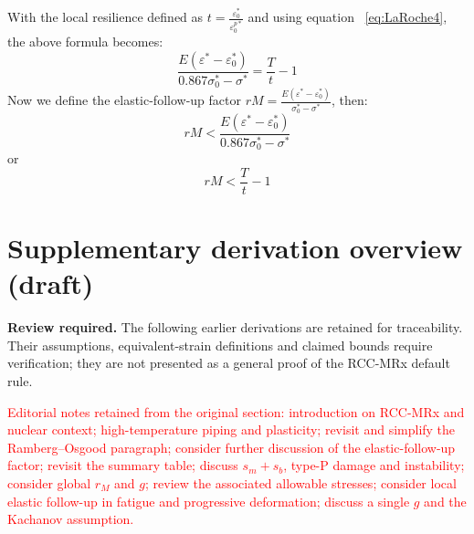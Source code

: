 \documentclass[10pt,a4paper]{article}
\let\oldsection\section
\newif\ifsectionstarted
\renewcommand{\section}{%
  \ifsectionstarted\clearpage\else\global\sectionstartedtrue\FloatBarrier\fi
  \oldsection}
\begin{document}
With the local resilience defined as $t=\frac{\varepsilon_0^*}{\varepsilon_0^{p*}}$ and using equation ~\eqref{eq:LaRoche4}, the above formula becomes:
	\begin{equation*}
		\frac{E(\varepsilon^*-\varepsilon_0^*)} {0.867\sigma_0^*-\sigma^*} =    \frac{T}{t} -1      
	\end{equation*}
Now we define the elastic-follow-up factor $rM=\frac{E(\varepsilon^* - \varepsilon_0^*)}{ \sigma_0^*-\sigma^* }  $, then:
\begin{equation*}
	rM    < \frac{E(\varepsilon^*-\varepsilon_0^*)} {0.867\sigma_0^*-\sigma^*} 
\end{equation*}
or 
\begin{equation}
	rM    <  \frac{T}{t}-1 
	\label{def:EFU-3rd}
\end{equation}



















\newpage
\section{\texorpdfstring{}{Appendix \thesection: }Supplementary derivation overview (draft)}
\label{app:derivation-overview}

\textbf{Review required.} The following earlier derivations are retained for traceability. Their assumptions, equivalent-strain definitions and claimed bounds require verification; they are not presented as a general proof of the RCC-MRx default rule.

\textcolor{red}{Editorial notes retained from the original section: introduction on RCC-MRx and nuclear context; high-temperature piping and plasticity; revisit and simplify the Ramberg--Osgood paragraph; consider further discussion of the elastic-follow-up factor; revisit the summary table; discuss $s_m+s_b$, type-P damage and instability; consider global $r_M$ and $g$; review the associated allowable stresses; consider local elastic follow-up in fatigue and progressive deformation; discuss a single $g$ and the Kachanov assumption.}
\end{document}
